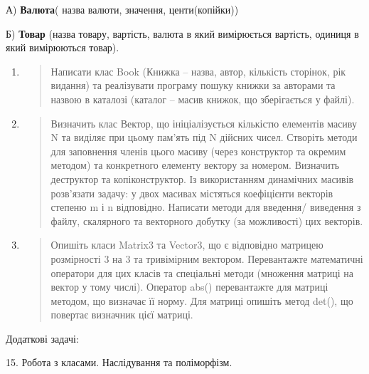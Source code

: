 \documentclass[]{article}
\begin{document}
А) \textbf{Валюта}( назва валюти, значення, центи(копійки))

Б) \textbf{Товар} (назва товару, вартість, валюта в який вимірюється
вартість, одиниця в який вимірюються товар).

\begin{enumerate}
\def\labelenumi{\arabic{enumi})}
\item
  \begin{quote}
  Написати клас Book (Книжка -- назва, автор, кількість сторінок, рік
  видання) та реалізувати програму пошуку книжки за авторами та назвою в
  каталозі (каталог -- масив книжок, що зберігається у файлі).
  \end{quote}
\item
  \begin{quote}
  Визначить клас Вектор, що ініціалізується кількістю елементів масиву N
  та виділяє при цьому пам'ять під N дійсних чисел. Створіть методи для
  заповнення членів цього масиву (через конструктор та окремим методом)
  та конкретного елементу вектору за номером. Визначить деструктор та
  копіконструктор. Із використанням динамічних масивів розв'язати
  задачу: у двох масивах містяться коефіцієнти векторів степеню m і n
  відповідно. Написати методи для введення/ виведення з файлу,
  скалярного та векторного добутку (за можливості) цих векторів.
  \end{quote}
\item
  \begin{quote}
  Опишіть класи Matrix3 та Vector3, що є відповідно матрицею розмірності
  3 на 3 та тривімірним вектором. Перевантажте математичні оператори для
  цих класів та спеціальні методи (множення матриці на вектор у тому
  числі). Оператор abs() перевантажте для матриці методом, що визначає
  її норму. Для матриці опишіть метод det(), що повертає визначник цієї
  матриці.
  \end{quote}
\end{enumerate}

Додаткові задачі:

15. Робота з класами. Наслідування та поліморфізм.
\end{document}
